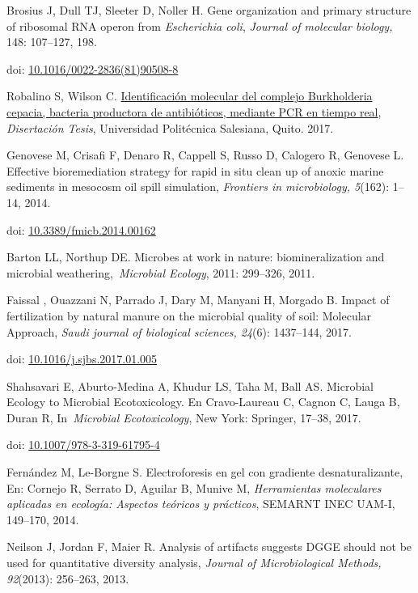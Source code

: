 \begin{thebibliography}{99}
 Brosius J, Dull TJ, Sleeter D, Noller H. Gene organization and
primary structure of ribosomal RNA operon from \emph{Escherichia coli},
\emph{Journal of molecular biology,} 148: 107--127, 198.

doi: \href{https://doi.org/10.1016/0022-2836(81)90508-8}{10.1016/0022-2836(81)90508-8}

 Robalino S, Wilson C. 
\href{https://dspace.ups.edu.ec/handle/123456789/14669}{Identificación molecular del complejo Burkholderia cepacia, bacteria productora de antibióticos, mediante PCR en tiempo real}, 
\emph{Disertación Tesis}, Universidad Politécnica
Salesiana, Quito. 2017.

 Genovese M, Crisafi F, Denaro R, Cappell S, Russo D, Calogero
R, Genovese L. Effective bioremediation strategy for rapid in situ clean
up of anoxic marine sediments in mesocosm oil spill simulation,
\emph{Frontiers in microbiology, 5}(162): 1--14, 2014.

doi: \href{https://doi.org/10.3389/fmicb.2014.00162}{10.3389/fmicb.2014.00162}

 Barton LL, Northup DE. Microbes at work in nature:
biomineralization and microbial weathering,~\emph{Microbial Ecology},
2011: 299--326, 2011.

 Faissal , Ouazzani N, Parrado J, Dary M, Manyani H, Morgado B.
Impact of fertilization by natural manure on the microbial quality of
soil: Molecular Approach, \emph{Saudi journal of biological sciences,
24}(6): 1437--144, 2017.

doi: \href{https://doi.org/10.1016/j.sjbs.2017.01.005}{10.1016/j.sjbs.2017.01.005}

 Shahsavari E, Aburto-Medina A, Khudur LS, Taha M, Ball AS.
Microbial Ecology to Microbial Ecotoxicology. En Cravo-Laureau C, Cagnon
C, Lauga B, Duran R, In~\emph{Microbial Ecotoxicology}, New York:
Springer, 17--38, 2017.

doi: \href{https://doi.org/10.1007/978-3-319-61795-4}{10.1007/978-3-319-61795-4}

 Fernández M, Le-Borgne S. Electroforesis en gel con gradiente
desnaturalizante, En: Cornejo R, Serrato D, Aguilar B, Munive M,
\emph{Herramientas moleculares aplicadas en ecología: Aspectos teóricos
y prácticos}, SEMARNT INEC UAM-I, 149--170, 2014.

 Neilson J, Jordan F, Maier R. Analysis of artifacts suggests
DGGE should not be used for quantitative diversity analysis,
\emph{Journal of Microbiological Methods, 92}(2013): 256--263, 2013.


\end{thebibliography}
